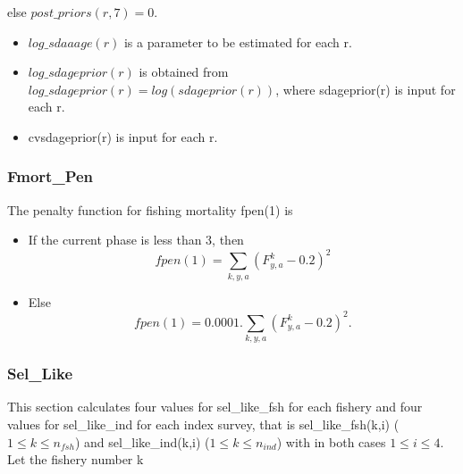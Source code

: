 \documentclass{article}
\begin{document}
\begin{itemize}
        else $post\_priors(r,7)=0.$
        \begin{itemize}
            \item $log\_sdaaage(r)$ is a parameter to be estimated for each r.
            \item $log\_sdageprior(r)$ is obtained from $log\_sdageprior(r)=log(sdageprior(r))$, where sdageprior(r) is input for each r.
            \item cvsdageprior(r) is input for each r.
        \end{itemize}
    \end{itemize}



\subsubsection{Fmort\_Pen}
The penalty function for fishing mortality fpen(1) is

\begin{itemize}
    \item If the current phase is less than 3, then
    \begin{equation}
        fpen(1)=\sum_{k,y,a}(F^k_{y,a}-0.2)^2
    \end{equation}
    \item Else
    \begin{equation}
        fpen(1)=0.0001.\sum_{k,y,a}(F^k_{y,a}-0.2)^2.
    \end{equation}
\end{itemize}

\subsubsection{Sel\_Like}
This section calculates four values for sel\_like\_fsh for  each fishery and four values for  sel\_like\_ind for each index survey, that is sel\_like\_fsh(k,i) ($1\leq k \leq n_{fsh}$) and  sel\_like\_ind(k,i) ($1\leq k \leq n_{ind}$) with in both cases $1\leq i \leq 4$.
Let the fishery number k
\end{document}

